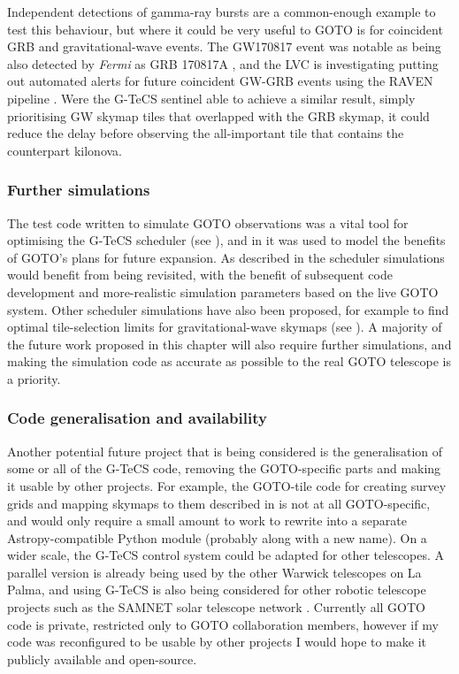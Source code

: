 \begin{colsection}
\begin{colsection}
Independent detections of gamma-ray bursts are a common-enough example to test this behaviour, but where it could be very useful to GOTO is for coincident GRB and gravitational-wave events. The GW170817 event was notable as being also detected by \textit{Fermi} as GRB 170817A \citep{GW170817_Fermi}, and the LVC is investigating putting out automated alerts for future coincident GW-GRB events using the RAVEN pipeline \citep{RAVEN, LVC_userguide}. Were the G-TeCS sentinel able to achieve a similar result, simply prioritising GW skymap tiles that overlapped with the GRB skymap, it could reduce the delay before observing the all-important tile that contains the counterpart kilonova.

\subsubsection{Further simulations}

The test code written to simulate GOTO observations was a vital tool for optimising the G-TeCS scheduler (see ), and in  it was used to model the benefits of GOTO's plans for future expansion. As described in  the scheduler simulations would benefit from being revisited, with the benefit of subsequent code development and more-realistic simulation parameters based on the live GOTO system. Other scheduler simulations have also been proposed, for example to find optimal tile-selection limits for gravitational-wave skymaps (see ). A majority of the future work proposed in this chapter will also require further simulations, and making the simulation code as accurate as possible to the real GOTO telescope is a priority.

\subsubsection{Code generalisation and availability}

Another potential future project that is being considered is the generalisation of some or all of the G-TeCS code, removing the GOTO-specific parts and making it usable by other projects. For example, the GOTO-tile code for creating survey grids and mapping skymaps to them described in  is not at all GOTO-specific, and would only require a small amount to work to rewrite into a separate Astropy-compatible Python module (probably along with a new name). On a wider scale, the G-TeCS control system could be adapted for other telescopes. A parallel version is already being used by the other Warwick telescopes on La Palma, and using G-TeCS is also being considered for other robotic telescope projects such as the SAMNET solar telescope network \citep{SAMNET}. Currently all GOTO code is private, restricted only to GOTO collaboration members, however if my code was reconfigured to be usable by other projects I would hope to make it publicly available and open-source.


\end{colsection}
\end{colsection}

